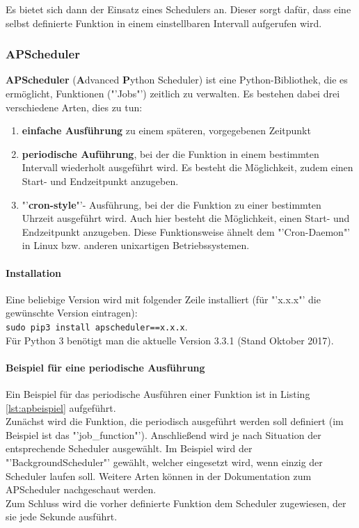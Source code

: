 Es bietet sich dann der Einsatz eines Schedulers an. Dieser sorgt dafür, dass eine selbst definierte Funktion in einem einstellbaren Intervall aufgerufen wird.

\subsubsection{APScheduler}
\textbf{APScheduler} (\textbf{A}dvanced \textbf{P}ython Scheduler) ist eine Python-Bibliothek, die es ermöglicht, Funktionen ("'Jobs"') zeitlich zu verwalten. Es bestehen dabei drei verschiedene Arten, dies zu tun:
\begin{enumerate}
	\item \textbf{einfache Ausführung} zu einem späteren, vorgegebenen Zeitpunkt
	\item \textbf{periodische Auführung}, bei der die Funktion in einem bestimmten Intervall wiederholt ausgeführt wird. Es besteht die Möglichkeit, zudem einen Start- und Endzeitpunkt anzugeben.
	\item "'\textbf{cron-style}"'- Ausführung, bei der die Funktion zu einer bestimmten Uhrzeit ausgeführt wird. Auch hier besteht die Möglichkeit, einen Start- und Endzeitpunkt anzugeben. Diese Funktionsweise ähnelt dem "'Cron-Daemon"' in Linux bzw. anderen unixartigen Betriebssystemen.
\end{enumerate}

\paragraph{Installation}

Eine beliebige Version wird mit folgender Zeile installiert (für "'x.x.x"' die gewünschte Version eintragen):\\ \texttt{sudo pip3 install apscheduler==x.x.x}. \\
Für Python 3 benötigt man die aktuelle Version 3.3.1 (Stand Oktober 2017).

\paragraph{Beispiel für eine periodische Ausführung}

Ein Beispiel für das periodische Ausführen einer Funktion ist in Listing \ref{lst:apbeispiel} aufgeführt.\\
Zunächst wird die Funktion, die periodisch ausgeführt werden soll definiert (im Beispiel ist das "'job\_function"'). Anschließend wird je nach Situation der entsprechende Scheduler ausgewählt. Im Beispiel wird der "'BackgroundScheduler"' gewählt, welcher eingesetzt wird, wenn einzig der Scheduler laufen soll. Weitere Arten können in der Dokumentation zum APScheduler nachgeschaut werden. \\
Zum Schluss wird die vorher definierte Funktion dem Scheduler zugewiesen, der sie jede Sekunde ausführt.

